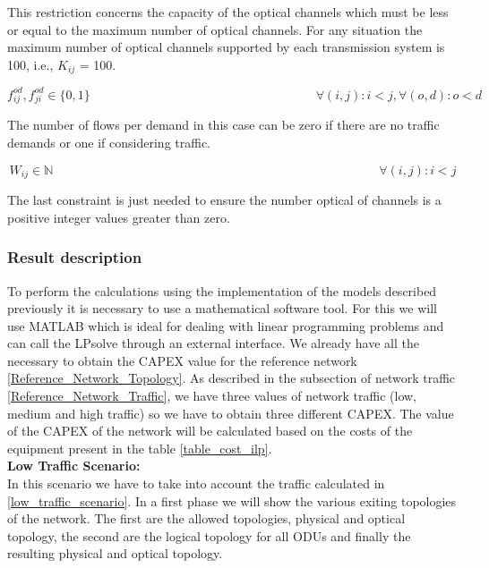 This restriction concerns the capacity of the optical channels which must be less or equal to the maximum number of optical channels. For any situation the maximum number of optical channels supported by each transmission system is 100, i.e., $K_{ij}$ = 100.

\begin{equation}
f_{ij}^{od} , f_{ji}^{od} \in \{0,1\}   \qquad \qquad \qquad \qquad \qquad \qquad \qquad \qquad \qquad
\forall(i,j) : i < j, \forall(o,d) : o < d
\label{ILPOpaque6_Surv}
\end{equation}

The number of flows per demand in this case can be zero if there are no traffic demands or one if considering traffic.

\begin{equation}
W_{ij} \in \mathbb{N}  \qquad \qquad \qquad \qquad \qquad \qquad \qquad \qquad \qquad \qquad \qquad \qquad \qquad
\forall(i,j) : i < j
\label{ILPOpaque7_Surv}
\end{equation}

The last constraint is just needed to ensure the number optical of channels is a positive integer values greater than zero.


\subsubsection{Result description}

To perform the calculations using the implementation of the models described previously it is necessary to use a mathematical software tool. For this we will use MATLAB which is ideal for dealing with linear programming problems and can call the LPsolve through an external interface.
We already have all the necessary to obtain the CAPEX value for the reference network \ref{Reference_Network_Topology}. As described in the subsection of network traffic \ref{Reference_Network_Traffic}, we have three values of network traffic (low, medium and high traffic) so we have to obtain three different CAPEX.
The value of the CAPEX of the network will be calculated based on the costs of the equipment present in the table \ref{table_cost_ilp}.\\


\textbf{Low Traffic Scenario:}\\

In this scenario we have to take into account the traffic calculated in \ref{low_traffic_scenario}. In a first phase we will show the various exiting topologies of the network. The first are the allowed topologies, physical and optical topology, the second are the logical topology for all ODUs and finally the resulting physical and optical topology.\\


